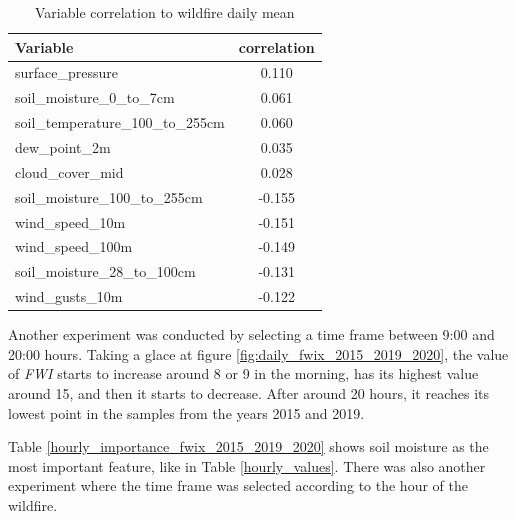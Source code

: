 \begin{table}[H]
	\caption{Variable correlation to wildfire daily mean}
	\centering
	\label{daily_values_correlation}
	\begin{tabular}{lc}
		\hline
		Variable                       & \multicolumn{1}{l}{correlation} \\ \hline
		surface\_pressure                             & 0.110                         \\
		soil\_moisture\_0\_to\_7cm                            & 0.061                          \\
		soil\_temperature\_100\_to\_255cm & 0.060                          \\
		dew\_point\_2m                            & 0.035                          \\
		cloud\_cover\_mid              & 0.028   \\
		soil\_moisture\_100\_to\_255cm & -0.155 \\
		wind\_speed\_10m & -0.151 \\
		wind\_speed\_100m & -0.149 \\
		soil\_moisture\_28\_to\_100cm & -0.131 \\
		wind\_gusts\_10m & -0.122 \\                   
	\end{tabular}
\end{table}


Another experiment was conducted by selecting a time frame between 9:00 and 20:00 hours. Taking a glace at figure \ref{fig:daily_fwix_2015_2019_2020}, the value of \textit{FWI} starts to increase around 8 or 9 in the morning, has its highest value around 15, and then it starts to decrease. After around 20 hours, it reaches its lowest point in the samples from the years 2015 and 2019. 


Table \ref{hourly_importance_fwix_2015_2019_2020} shows soil moisture as the most important feature, like in Table \ref{hourly_values}. There was also another experiment where the time frame was selected according to the hour of the wildfire. 



